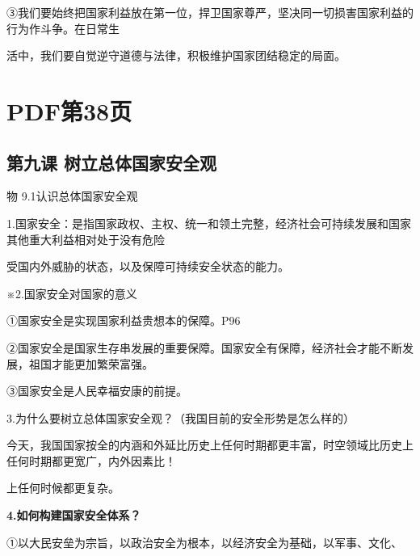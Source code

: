 \documentclass[lang=cn,11pt]{elegantbook}
\newcommand{\daofasym}[1]{{\daofasymbolfont #1}}
\newcommand{\daofasym}[1]{#1}
\begin{document}
\daofasym{③}我们要始终把国家利益放在第一位，捍卫国家尊严，坚决同一切损害国家利益的行为作斗争。在日常生\par

活中，我们要自觉逆守道德与法律，积极维护国家团结稳定的局面。\par


\section*{PDF第38页}

\subsection*{第九课 树立总体国家安全观}

物 9.1认识总体国家安全观\par

1.国家安全：是指国家政权、主权、统一和领土完整，经济社会可持续发展和国家其他重大利益相对处于没有危险\par

受国内外威胁的状态，以及保障可持续安全状态的能力。\par

※2.国家安全对国家的意义\par

\daofasym{①}国家安全是实现国家利益贵想本的保障。P96\par

\daofasym{②}国家安全是国家生存串发展的重要保障。国家安全有保障，经济社会才能不断发展，祖国才能更加繁荣富强。\par

\daofasym{③}国家安全是人民幸福安康的前提。\par

3.为什么要树立总体国家安全观？（我国目前的安全形势是怎么样的）\par

今天，我国国家按全的内涵和外延比历史上任何时期都更丰富，时空领域比历史上任何时期都更宽广，内外因素比！\par

上任何时候都更复杂。\par

\textbf{4.如何构建国家安全体系？}\par

\daofasym{①}以大民安垒为宗旨，以政治安全为根本，以经济安全为基础，以军事、文化、\par
\end{document}
